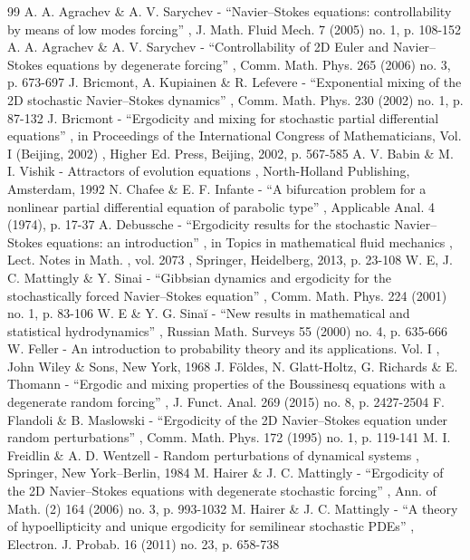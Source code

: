 \begin{thebibliography}{99}
 A. A. Agrachev \& A. V. Sarychev - “Navier–Stokes equations: controllability by means of low modes forcing” , J. Math. Fluid Mech. 7 (2005) no. 1, p. 108-152
 A. A. Agrachev \& A. V. Sarychev - “Controllability of 2D Euler and Navier–Stokes equations by degenerate forcing” , Comm. Math. Phys. 265 (2006) no. 3, p. 673-697
 J. Bricmont, A. Kupiainen \& R. Lefevere - “Exponential mixing of the 2D stochastic Navier–Stokes dynamics” , Comm. Math. Phys. 230 (2002) no. 1, p. 87-132
 J. Bricmont - “Ergodicity and mixing for stochastic partial differential equations” , in Proceedings of the International Congress of Mathematicians, Vol. I (Beijing, 2002) , Higher Ed. Press, Beijing, 2002, p. 567-585
 A. V. Babin \& M. I. Vishik - Attractors of evolution equations , North-Holland Publishing, Amsterdam, 1992
 N. Chafee \& E. F. Infante - “A bifurcation problem for a nonlinear partial differential equation of parabolic type” , Applicable Anal. 4 (1974), p. 17-37
 A. Debussche - “Ergodicity results for the stochastic Navier–Stokes equations: an introduction” , in Topics in mathematical fluid mechanics , Lect. Notes in Math. , vol. 2073 , Springer, Heidelberg, 2013, p. 23-108
 W. E, J. C. Mattingly \& Y. Sinai - “Gibbsian dynamics and ergodicity for the stochastically forced Navier–Stokes equation” , Comm. Math. Phys. 224 (2001) no. 1, p. 83-106
 W. E \& Y. G. Sinaĭ - “New results in mathematical and statistical hydrodynamics” , Russian Math. Surveys 55 (2000) no. 4, p. 635-666
 W. Feller - An introduction to probability theory and its applications. Vol. I , John Wiley \& Sons, New York, 1968
 J. Földes, N. Glatt-Holtz, G. Richards \& E. Thomann - “Ergodic and mixing properties of the Boussinesq equations with a degenerate random forcing” , J. Funct. Anal. 269 (2015) no. 8, p. 2427-2504
 F. Flandoli \& B. Maslowski - “Ergodicity of the 2D Navier–Stokes equation under random perturbations” , Comm. Math. Phys. 172 (1995) no. 1, p. 119-141
 M. I. Freidlin \& A. D. Wentzell - Random perturbations of dynamical systems , Springer, New York–Berlin, 1984
 M. Hairer \& J. C. Mattingly - “Ergodicity of the 2D Navier–Stokes equations with degenerate stochastic forcing” , Ann. of Math. (2) 164 (2006) no. 3, p. 993-1032
 M. Hairer \& J. C. Mattingly - “A theory of hypoellipticity and unique ergodicity for semilinear stochastic PDEs” , Electron. J. Probab. 16 (2011) no. 23, p. 658-738

\end{thebibliography}
